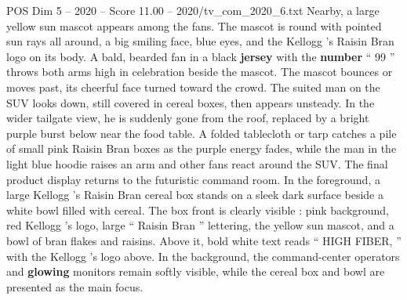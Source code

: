 \begin{textsample}{POS Dim 5 – 2020 – Score 11.00 – 2020/tv\_com\_2020\_6.txt}
Nearby, a large yellow sun mascot appears among the fans.
The mascot is round with pointed sun rays all around, a big smiling face, blue eyes, and the Kellogg ’s Raisin Bran logo on its body.
A bald, bearded fan in a black \textbf{jersey} with the \textbf{number} “ 99 ” throws both arms high in celebration beside the mascot.
The mascot bounces or moves past, its cheerful face turned toward the crowd.
The suited man on the SUV looks down, still covered in cereal boxes, then appears unsteady.
In the wider tailgate view, he is suddenly gone from the roof, replaced by a bright purple burst below near the food table.
A folded tablecloth or tarp catches a pile of small pink Raisin Bran boxes as the purple energy fades, while the man in the light blue hoodie raises an arm and other fans react around the SUV.
The final product display returns to the futuristic command room.
In the foreground, a large Kellogg ’s Raisin Bran cereal box stands on a sleek dark surface beside a white bowl filled with cereal.
The box front is clearly visible : pink background, red Kellogg ’s logo, large “ Raisin Bran ” lettering, the yellow sun mascot, and a bowl of bran flakes and raisins.
Above it, bold white text reads “ HIGH FIBER, ” with the Kellogg ’s logo above.
In the background, the command-center operators and \textbf{glowing} monitors remain softly visible, while the cereal box and bowl are presented as the main focus.

\end{textsample}
